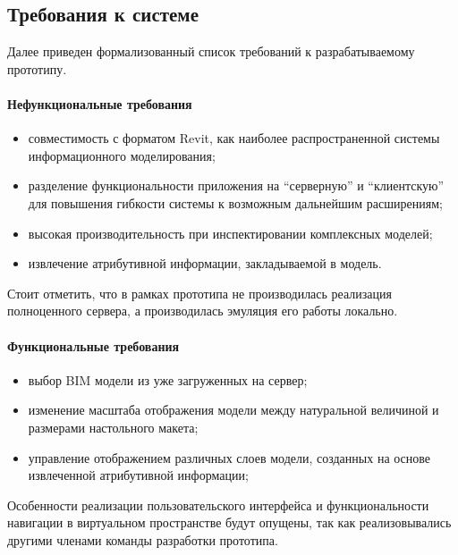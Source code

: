 ﻿\subsection{Требования к системе}

Далее приведен формализованный список требований к разрабатываемому прототипу.

\paragraph{Нефункциональные требования}
\begin{itemize}
    \item совместимость с форматом Revit,
    как наиболее распространенной системы информационного моделирования;
    \item разделение функциональности приложения на ``серверную'' и ``клиентскую''
    для повышения гибкости системы к возможным дальнейшим расширениям;
    \item высокая производительность при инспектировании комплексных моделей;
    \item извлечение атрибутивной информации,
    закладываемой в модель.
\end{itemize}

Стоит отметить, что в рамках прототипа не производилась реализация полноценного сервера,
а производилась эмуляция его работы локально.

\paragraph{Функциональные требования}
\begin{itemize}
    \item выбор BIM модели из уже загруженных на сервер;
    \item изменение масштаба отображения модели
    между натуральной величиной и размерами настольного макета;
    \item управление отображением различных слоев модели,
    созданных на основе извлеченной атрибутивной информации;
\end{itemize}

Особенности реализации пользовательского интерфейса и
функциональности навигации в виртуальном пространстве будут опущены,
так как реализовывались другими членами команды разработки прототипа.